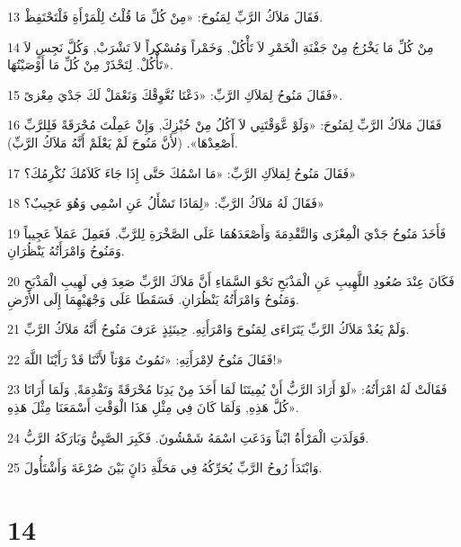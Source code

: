 \par 13 فَقَالَ مَلاَكُ الرَّبِّ لِمَنُوحَ: «مِنْ كُلِّ مَا قُلْتُ لِلْمَرْأَةِ فَلْتَحْتَفِظْ.
\par 14 مِنْ كُلِّ مَا يَخْرُجُ مِنْ جَفْنَةِ الْخَمْرِ لاَ تَأْكُلْ, وَخَمْراً وَمُسْكِراً لاَ تَشْرَبْ, وَكُلَّ نَجِسٍ لاَ تَأْكُلْ. لِتَحْذَرْ مِنْ كُلِّ مَا أَوْصَيْتُهَا».
\par 15 فَقَالَ مَنُوحُ لِمَلاَكِ الرَّبِّ: «دَعْنَا نُعَّوِقْكَ وَنَعْمَلْ لَكَ جَدْيَ مِعْزىً».
\par 16 فَقَالَ مَلاَكُ الرَّبِّ لِمَنُوحَ: «وَلَوْ عَّوَقْتَنِي لاَ آكُلُ مِنْ خُبْزِكَ, وَإِنْ عَمِلْتَ مُحْرَقَةً فَلِلرَّبِّ أَصْعِدْهَا». (لأَنَّ مَنُوحَ لَمْ يَعْلَمْ أَنَّهُ مَلاَكُ الرَّبِّ).
\par 17 فَقَالَ مَنُوحُ لِمَلاَكِ الرَّبِّ: «مَا اسْمُكَ حَتَّى إِذَا جَاءَ كَلاَمُكَ نُكْرِمُكَ؟»
\par 18 فَقَالَ لَهُ مَلاَكُ الرَّبِّ: «لِمَاذَا تَسْأَلُ عَنِ اسْمِي وَهُوَ عَجِيبٌ؟»
\par 19 فَأَخَذَ مَنُوحُ جَدْيَ الْمِعْزَى وَالتَّقْدِمَةَ وَأَصْعَدَهُمَا عَلَى الصَّخْرَةِ لِلرَّبِّ. فَعَمِلَ عَمَلاً عَجِيباً وَمَنُوحُ وَامْرَأَتُهُ يَنْظُرَانِ.
\par 20 فَكَانَ عِنْدَ صُعُودِ اللَّهِيبِ عَنِ الْمَذْبَحِ نَحْوَ السَّمَاءِ أَنَّ مَلاَكَ الرَّبِّ صَعِدَ فِي لَهِيبِ الْمَذْبَحِ وَمَنُوحُ وَامْرَأَتُهُ يَنْظُرَانِ. فَسَقَطَا عَلَى وَجْهَيْهِمَا إِلَى الأَرْضِ.
\par 21 وَلَمْ يَعُدْ مَلاَكُ الرَّبِّ يَتَرَاءَى لِمَنُوحَ وَامْرَأَتِهِ. حِينَئِذٍ عَرَفَ مَنُوحُ أَنَّهُ مَلاَكُ الرَّبِّ.
\par 22 فَقَالَ مَنُوحُ لاِمْرَأَتِهِ: «نَمُوتُ مَوْتاً لأَنَّنَا قَدْ رَأَيْنَا اللَّهَ!»
\par 23 فَقَالَتْ لَهُ امْرَأَتُهُ: «لَوْ أَرَادَ الرَّبُّ أَنْ يُمِيتَنَا لَمَا أَخَذَ مِنْ يَدِنَا مُحْرَقَةً وَتَقْدِمَةً, وَلَمَا أَرَانَا كُلَّ هَذِهِ, وَلَمَا كَانَ فِي مِثْلِ هَذَا الْوَقْتِ أَسْمَعَنَا مِثْلَ هَذِهِ».
\par 24 فَوَلَدَتِ الْمَرْأَةُ ابْناً وَدَعَتِ اسْمَهُ شَمْشُونَ. فَكَبِرَ الصَّبِيُّ وَبَارَكَهُ الرَّبُّ.
\par 25 وَابْتَدَأَ رُوحُ الرَّبِّ يُحَرِّكُهُ فِي مَحَلَّةِ دَانٍَ بَيْنَ صُرْعَةَ وَأَشْتَأُولَ.

\chapter{14}

